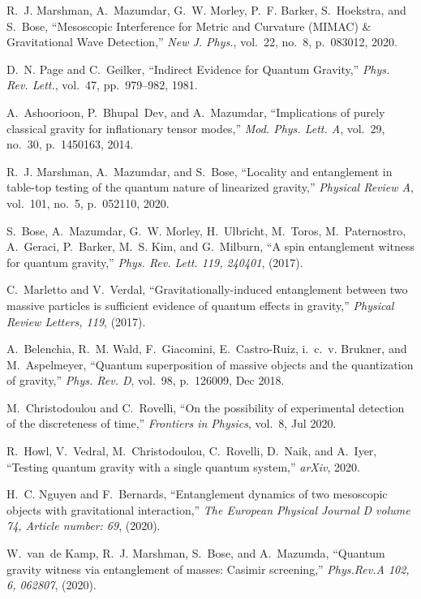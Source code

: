 \documentclass[%
 12pt,
 superscriptaddress,
 amsmath,
 amssymb,
 onecolumn,
 longbibliography
]{revtex4-2}
\begin{document}
\begin{thebibliography}{10}
R.~J. Marshman, A.~Mazumdar, G.~W. Morley, P.~F. Barker, S.~Hoekstra, and
  S.~Bose, ``{Mesoscopic Interference for Metric and Curvature (MIMAC) $\&$
  Gravitational Wave Detection},'' {\em New J. Phys.}, vol.~22, no.~8,
  p.~083012, 2020.

D.~N. Page and C.~Geilker, ``{Indirect Evidence for Quantum Gravity},'' {\em
  Phys. Rev. Lett.}, vol.~47, pp.~979--982, 1981.

A.~Ashoorioon, P.~Bhupal~Dev, and A.~Mazumdar, ``{Implications of purely
  classical gravity for inflationary tensor modes},'' {\em Mod. Phys. Lett. A},
  vol.~29, no.~30, p.~1450163, 2014.

R.~J. Marshman, A.~Mazumdar, and S.~Bose, ``Locality and entanglement in
  table-top testing of the quantum nature of linearized gravity,'' {\em
  Physical Review A}, vol.~101, no.~5, p.~052110, 2020.

S.~Bose, A.~Mazumdar, G.~W. Morley, H.~Ulbricht, M.~Toros, M.~Paternostro,
  A.~Geraci, P.~Barker, M.~S. Kim, and G.~Milburn, ``A spin entanglement
  witness for quantum gravity,'' {\em Phys. Rev. Lett. 119, 240401}, (2017).

C.~Marletto and V.~Verdal, ``Gravitationally-induced entanglement between two
  massive particles is sufficient evidence of quantum effects in gravity,''
  {\em Physical Review Letters, 119}, (2017).

A.~Belenchia, R.~M. Wald, F.~Giacomini, E.~Castro-Ruiz, i.~c.~v. Brukner, and
  M.~Aspelmeyer, ``Quantum superposition of massive objects and the
  quantization of gravity,'' {\em Phys. Rev. D}, vol.~98, p.~126009, Dec 2018.

M.~Christodoulou and C.~Rovelli, ``On the possibility of experimental detection
  of the discreteness of time,'' {\em Frontiers in Physics}, vol.~8, Jul 2020.

R.~Howl, V.~Vedral, M.~Christodoulou, C.~Rovelli, D.~Naik, and A.~Iyer,
  ``Testing quantum gravity with a single quantum system,'' {\em arXiv}, 2020.

H.~C. Nguyen and F.~Bernards, ``Entanglement dynamics of two mesoscopic objects
  with gravitational interaction,'' {\em The European Physical Journal D volume
  74, Article number: 69}, (2020).

W.~van~de Kamp, R.~J. Marshman, S.~Bose, and A.~Mazumda, ``Quantum gravity
  witness via entanglement of masses: Casimir screening,'' {\em Phys.Rev.A 102,
  6, 062807}, (2020).


\end{thebibliography}
\end{document}
